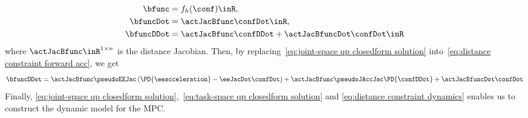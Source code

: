 \begin{align}
	\label{eq:distance constraint forward kinematics}\bfunc &= f_h(\conf) \inR, \\
	\label{eq:distance constraint forward vel}\bfuncDot &=\actJacBfunc\confDot\inR, \\
	\label{eq:distance constraint forward acc}\bfuncDDot&=\actJacBfunc\confDDot + \actJacBfuncDot\confDot\inR
\end{align} where $\actJacBfunc\inR^{1\times n}$ is the distance Jacobian. 
Then, by replacing~\eqref{eq:joint-space qp closedform solution} into~\eqref{eq:distance constraint forward acc}, we get 
\begin{equation}\label{eq:distance constraint dynamics}
	\bfuncDDot = \actJacBfunc\pseudoEEJac\left(\PD{\eeacceleration} - \eeJacDot \confDot\right) + \actJacBfunc\pseudoJAccJac\PD{\confDDot} + \actJacBfuncDot\confDot
\end{equation}
Finally, \cref{eq:joint-space qp closedform solution},~\cref{eq:task-space qp closedform solution} and \cref{eq:distance constraint dynamics} enables us to construct the dynamic model for the MPC. 
